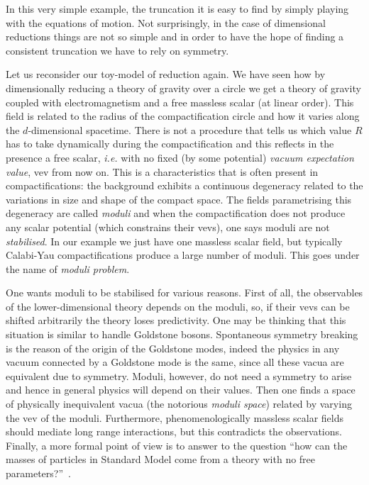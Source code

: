 \documentclass[debug]{phd}
\begin{document}
				In this very simple example, the truncation it is easy to find by simply playing with the equations of motion.
				Not surprisingly, in the case of dimensional reductions things are not so simple and in order to have the hope of finding a consistent truncation we have to rely on symmetry.
				
				Let us reconsider our toy-model of reduction again.
				We have seen how by dimensionally reducing a theory of gravity over a circle we get a theory of gravity coupled with electromagnetism and a free massless scalar (at linear order). 
				This field is related to the radius of the compactification circle and how it varies along the $d$-dimensional spacetime.
				There is not a procedure that tells us which value $R$ has to take dynamically during the compactification and this reflects in the presence a free scalar, \emph{i.e.} with no fixed (by some potential) \emph{vacuum expectation value}, vev from now on.
				This is a characteristics that is often present in compactifications: the background exhibits a continuous degeneracy related to the variations in size and shape of the compact space.
				The fields parametrising this degeneracy are called \emph{moduli} and when the compactification does not produce any scalar potential (which constrains their vevs), one says moduli are not \emph{stabilised}.
				In our example we just have one massless scalar field, but typically Calabi-Yau compactifications produce a large number of moduli.
				This goes under the name of \emph{moduli problem}.
			
				One wants moduli to be stabilised for various reasons.
				First of all, the observables of the lower-dimensional theory depends on the moduli, so, if their vevs can be shifted arbitrarily the theory loses predictivity.
				One may be thinking that this situation is similar to handle Goldstone bosons.
				Spontaneous symmetry breaking is the reason of the origin of the Goldstone modes, indeed the physics in any vacuum connected by a Goldstone mode is the same, since all these vacua are equivalent due to symmetry.
				Moduli, however, do not need a symmetry to arise and hence in general physics will depend on their values.
				Then one finds a space of physically inequivalent vacua (the notorious \emph{moduli space}) related by varying the vev of the moduli.
				Furthermore, phenomenologically massless scalar fields should mediate long range interactions, but this contradicts the observations.
				Finally, a more formal point of view is to answer to the question ``how can the masses of particles in Standard Model come from a theory with no free parameters?''~\cite{moduliLect, fluxcomp1}.
				
\end{document}
